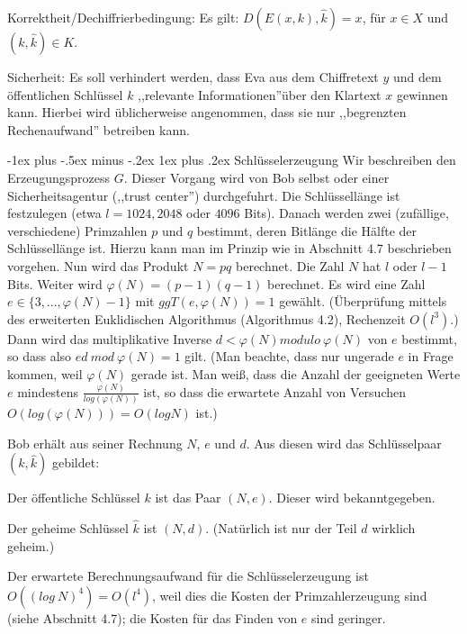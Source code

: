 \documentclass[a4paper]{article}
\makeatletter
\renewcommand{\subsubsection}{\@startsection{subsubsection}{3}{0mm}%
 {-1ex plus -.5ex minus -.2ex}%
 {1ex plus .2ex}%
 {\normalfont\small\bfseries}}
\makeatother
\begin{document}
\begin{multicols}{3}
        Korrektheit/Dechiffrierbedingung: Es gilt: $D(E(x,k), \hat{k}) =x$, für $x\in X$ und $(k,\hat{k})\in K$.

        Sicherheit: Es soll verhindert werden, dass Eva aus dem Chiffretext $y$ und dem öffentlichen Schlüssel $k$ ,,relevante Informationen''über den Klartext $x$ gewinnen kann. Hierbei wird üblicherweise angenommen, dass sie nur ,,begrenzten Rechenaufwand'' betreiben kann.

        \subsubsection{Schlüsselerzeugung}
        Wir beschreiben den Erzeugungsprozess $G$. Dieser Vorgang wird von Bob selbst oder einer Sicherheitsagentur (,,trust center'') durchgefuhrt. Die Schlüssellänge ist festzulegen (etwa $l= 1024, 2048$ oder $4096$ Bits). Danach werden zwei (zufällige, verschiedene) Primzahlen $p$ und $q$ bestimmt, deren Bitlänge die Hälfte der Schlüssellänge ist.
        Hierzu kann man im Prinzip wie in Abschnitt 4.7 beschrieben vorgehen. Nun wird das Produkt $N=pq$ berechnet. Die Zahl $N$ hat $l$ oder $l-1$ Bits. Weiter wird $\varphi(N) = (p-1)(q-1)$ berechnet. Es wird eine Zahl $e\in\{3,...,\varphi(N)-1\}$ mit $ggT(e,\varphi(N)) = 1$ gewählt. (Überprüfung mittels des erweiterten Euklidischen Algorithmus (Algorithmus 4.2), Rechenzeit $O(l^3)$.) Dann wird das multiplikative Inverse $d<\varphi(N) modulo\ \varphi(N)$ von $e$ bestimmt, so dass also $ed\ mod\ \varphi(N) = 1$ gilt. (Man beachte, dass nur ungerade $e$ in Frage kommen, weil $\varphi(N)$ gerade ist. Man weiß, dass die Anzahl der geeigneten Werte $e$ mindestens $\frac{\varphi(N)}{log(\varphi(N))}$ ist, so dass die erwartete Anzahl von Versuchen $O(log(\varphi(N)))=O(logN)$ ist.)

        Bob erhält aus seiner Rechnung $N$, $e$ und $d$. Aus diesen wird das Schlüsselpaar $(k,\hat{k})$ gebildet:
        \begin{itemize*}
            \item Der öffentliche Schlüssel $k$ ist das Paar $(N,e)$. Dieser wird bekanntgegeben.
            \item  Der geheime Schlüssel $\hat{k}$ ist $(N,d)$. (Natürlich ist nur der Teil $d$ wirklich geheim.)
        \end{itemize*}

        Der erwartete Berechnungsaufwand für die Schlüsselerzeugung ist $O((log\ N)^4) =O(l^4)$, weil dies die Kosten der Primzahlerzeugung sind (siehe Abschnitt 4.7); die Kosten für das Finden von $e$ sind geringer.


\end{multicols}
\end{document}
